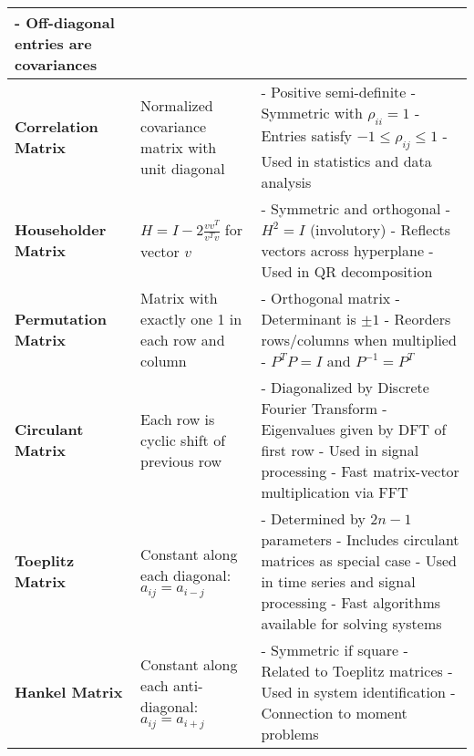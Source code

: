 \documentclass[12pt]{article}
\begin{document}
\begin{longtable}{|>{\bfseries}m{3.5cm}|m{5cm}|m{10.5cm}|}
		- Off-diagonal entries are covariances \\
		\hline
		Correlation Matrix & Normalized covariance matrix with unit diagonal &
		- Positive semi-definite \newline
		- Symmetric with $\rho_{ii} = 1$ \newline
		- Entries satisfy $-1 \leq \rho_{ij} \leq 1$ \newline
		- Used in statistics and data analysis \\
		\hline
		Householder Matrix & $H = I - 2\frac{vv^T}{v^T v}$ for vector $v$ &
		- Symmetric and orthogonal \newline
		- $H^2 = I$ (involutory) \newline
		- Reflects vectors across hyperplane \newline
		- Used in QR decomposition \\
		\hline
		Permutation Matrix & Matrix with exactly one 1 in each row and column &
		- Orthogonal matrix \newline
		- Determinant is $\pm 1$ \newline
		- Reorders rows/columns when multiplied \newline
		- $P^T P = I$ and $P^{-1} = P^T$ \\
		\hline
		Circulant Matrix & Each row is cyclic shift of previous row &
		- Diagonalized by Discrete Fourier Transform \newline
		- Eigenvalues given by DFT of first row \newline
		- Used in signal processing \newline
		- Fast matrix-vector multiplication via FFT \\
		\hline
		Toeplitz Matrix & Constant along each diagonal: $a_{ij} = a_{i-j}$ &
		- Determined by $2n-1$ parameters \newline
		- Includes circulant matrices as special case \newline
		- Used in time series and signal processing \newline
		- Fast algorithms available for solving systems \\
		\hline
		Hankel Matrix & Constant along each anti-diagonal: $a_{ij} = a_{i+j}$ &
		- Symmetric if square \newline
		- Related to Toeplitz matrices \newline
		- Used in system identification \newline
		- Connection to moment problems \\
		\hline

\end{longtable}
\end{document}
